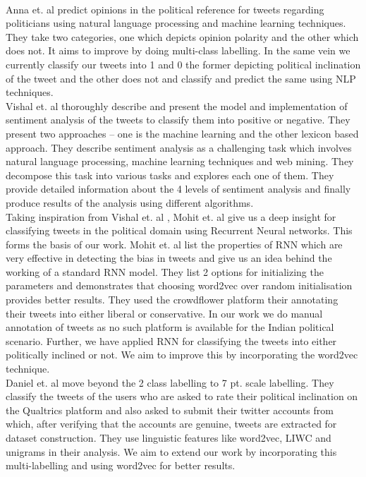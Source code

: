 \documentclass[a4paper,11pt]{article}
\begin{document}
\medskip\\
Anna et. al \cite{stavrianou2014nlp} predict opinions in the political reference for tweets regarding politicians using natural language processing and machine learning techniques. They take two categories, one which depicts opinion polarity and the other which does not. It aims to improve by doing multi-class labelling. In the same vein we currently classify our tweets into 1 and 0 the former depicting political inclination of the tweet and the other does not and classify and predict the same using NLP techniques.
\medskip\\
Vishal et. al \cite{kharde2016sentiment} thoroughly describe and present the model and implementation of sentiment analysis of the tweets to classify them into positive or negative. They present two approaches – one is the machine learning and the other lexicon based approach. They describe sentiment analysis as a challenging task which involves natural language processing, machine learning techniques and web mining. They decompose this task into various tasks and explores each one of them. They provide detailed information about the 4 levels of sentiment analysis and finally produce results of the analysis using different algorithms. 
\medskip\\
Taking inspiration from Vishal et. al \cite{kharde2016sentiment}, Mohit et. al \cite{iyyer2014political}  give us a deep insight for classifying tweets in the political domain using Recurrent Neural networks. This forms the basis of our work. Mohit et. al \cite{iyyer2014political} list the properties of RNN which are very effective in detecting the bias in tweets and give us an idea behind the working of a standard RNN model. They list 2 options for initializing the parameters and demonstrates that choosing word2vec over random initialisation provides better results. They used the crowdflower platform their annotating their tweets into either liberal or conservative. In our work we do manual annotation of tweets as no such platform is available for the Indian political scenario. Further, we have applied RNN for classifying the tweets into either politically inclined or not. We aim to improve this by incorporating the word2vec technique. 
\medskip\\
Daniel et. al \cite{preoctiuc2017beyond} move beyond the 2 class labelling to 7 pt. scale labelling. They classify the tweets of the users who are asked to rate their political inclination on the Qualtrics platform and also asked to submit their twitter accounts from which, after verifying that the accounts are genuine, tweets are extracted for dataset construction. They use linguistic features like word2vec, LIWC and unigrams in their analysis. We aim to extend our work by incorporating this multi-labelling and using word2vec for better results. 
\newpage
\end{document}
